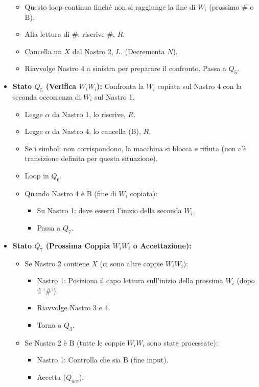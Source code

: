 \documentclass[a4paper]{article}
\newcommand{\B}{\text{B}} %
\begin{document}
\begin{itemize}
\begin{itemize}
            \item Questo loop continua finché non si raggiunge la fine di $W_i$ (prossimo $\#$ o $\B$).
            \item Alla lettura di $\#$: riscrive $\#$, $R$.
            \item Cancella un $X$ dal Nastro 2, $L$. (Decrementa $N$).
            \item Riavvolge Nastro 4 a sinistra per preparare il confronto. Passa a $Q_5$.
        \end{itemize}
    \item \textbf{Stato $Q_5$ (Verifica $W_i W_i$):}
        Confronta la $W_i$ copiata sul Nastro 4 con la seconda occorrenza di $W_i$ sul Nastro 1.
        \begin{itemize}
            \item Legge $\alpha$ da Nastro 1, lo riscrive, $R$.
            \item Legge $\alpha$ da Nastro 4, lo cancella ($\B$), $R$.
            \item Se i simboli non corrispondono, la macchina si blocca e rifiuta (non c'è transizione definita per questa situazione).
            \item Loop in $Q_6$.
            \item Quando Nastro 4 è $\B$ (fine di $W_i$ copiata):
                \begin{itemize}
                    \item Su Nastro 1: deve esserci l'inizio della seconda $W_i$.
                    \item Passa a $Q_7$.
                \end{itemize}
        \end{itemize}
    \item \textbf{Stato $Q_7$ (Prossima Coppia $W_i W_i$ o Accettazione):}
        \begin{itemize}
            \item Se Nastro 2 contiene $X$ (ci sono altre coppie $W_i W_i$):
                \begin{itemize}
                    \item Nastro 1: Posiziona il capo lettura sull'inizio della prossima $W_i$ (dopo il `#`).
                    \item Riavvolge Nastro 3 e 4.
                    \item Torna a $Q_3$.
                \end{itemize}
            \item Se Nastro 2 è $\B$ (tutte le coppie $W_i W_i$ sono state processate):
                \begin{itemize}
                    \item Nastro 1: Controlla che sia $\B$ (fine input).
                    \item Accetta ($Q_{acc}$).
                \end{itemize}
        \end{itemize}
\end{itemize}
\end{document}
